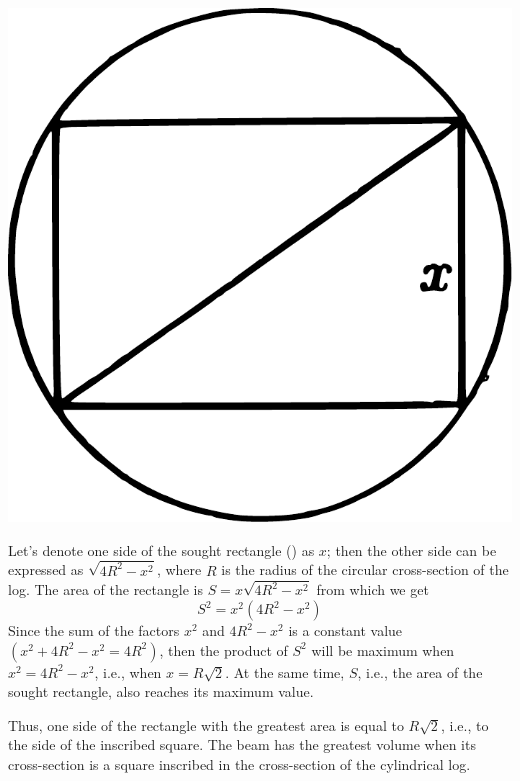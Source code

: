 \begin{marginfigure}%
\centering
\includegraphics[width=\textwidth]{figures/ch-12/fig-181.pdf}
\end{marginfigure}


Let's denote one side of the sought rectangle () as $x$; then the other side can be expressed as $\sqrt{4R^{2} - x^{2}}$, where $R$ is the radius of the circular cross-section of the log. The area of the rectangle is $S = x\sqrt{4R^{2} - x^{2}}$ from which we get
\begin{equation*}%
S^{2} = x^{2}(4R^{2} - x^{2})
\end{equation*}
Since the sum of the factors $x^{2}$ and $4R^{2} - x^{2}$ is a constant value $(x^{2} + 4R^{2} - x^{2} = 4R^{2})$, then the product of $S^{2}$ will be maximum when $x^{2} = 4R^{2} - x^{2}$, i.e., when $x = R\sqrt{2}$. At the same time, $S$, i.e., the area of the sought rectangle, also reaches its maximum value.

Thus, one side of the rectangle with the greatest area is equal to $R\sqrt{2}	$, i.e., to the side of the inscribed square. The beam has the greatest volume when its cross-section is a square inscribed in the cross-section of the cylindrical log.


